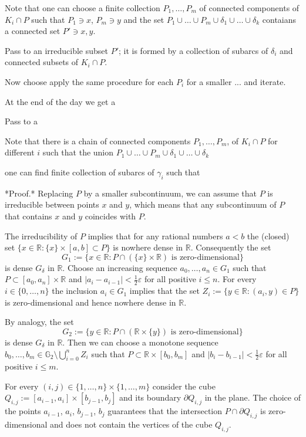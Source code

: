 Note that one can choose a finite collection $P_1,\dots,P_m$ of connected components of $K_i\cap P$ such that $P_1\ni x$, $P_m\ni y$
and the set $P_1\cup\dots\cup P_m\cup\delta_1\cup\dots\cup\delta_k$ contaians a connected set $P'\ni x,y$.

Pass to an irreducible subset $P'$; it is formed by a collection of subarcs of $\delta_i$ and connected subsets of $K_i\cap P$.

Now choose apply the same procedure for each $P_i$ for a smaller ...
and iterate.

At the end of the day we get a 

Pass to a 

Note that there is a chain of connected components $P_1,\dots,P_m$, of $K_i\cap P$ for different $i$ such that the union $P_1\cup\dots\cup P_m\cup\delta_1\cup\dots\cup\delta_k$ 

one can find finite collection of subarcs of $\gamma_i$ such that

*Proof.* Replacing $P$ by a smaller subcontinuum, we can assume that $P$ is irreducible between points $x$ and $y$, which means that any subcontinuum of $P$ that contains $x$ and $y$ coincides with $P$. 

The irreducibility of $P$ implies that for any rational numbers $a<b$ the (closed) set $\{x\in \mathbb R:\{x\}\times[a,b]\subset P\}$ is nowhere dense in $\mathbb R$. Consequently the set $$G_1:=\{x\in\mathbb R:P\cap(\{x\}\times\mathbb R)\mbox{ is zero-dimensional}\}$$is dense $G_\delta$ in $\mathbb R$. Choose an increasing sequence $a_0,\dots,a_n\in G_1$ such that $P\subset [a_0,a_n]\times\mathbb R$ and $|a_i-a_{i-1}|<\frac12\varepsilon$ for all positive $i\le n$. For every $i\in\{0,\dots,n\}$ the inclusion $a_i\in G_1$ implies that the set $Z_i:=\{y\in \mathbb R:(a_i,y)\in P\}$ is zero-dimensional and hence nowhere dense in $\mathbb R$.

By analogy, the set $$G_2:=\{y\in\mathbb R:P\cap(\mathbb R\times \{y\})\mbox{ is zero-dimensional}\}$$is dense $G_\delta$ in $\mathbb R$. Then we can choose a monotone sequence $b_0,\dots,b_m\in\mathbb G_2\setminus\bigcup_{i=0}^nZ_i$ such that $P\subset \mathbb R\times [b_0,b_m]$ and $|b_i-b_{i-1}|<\frac12\varepsilon$ for all positive $i\le m$.

For every $(i,j)\in\{1,\dots,n\}\times\{1,\dots,m\}$ consider the cube $Q_{i,j}:=[a_{i-1},a_i]\times[b_{j-1},b_j]$ and its boundary $\partial Q_{i,j}$ in the plane.
The choice of the points $a_{i-1}$, $a_i$, $b_{j-1}$, $b_j$ guarantees that the intersection $P\cap\partial Q_{i,j}$ is zero-dimensional and does not contain the vertices of the cube $Q_{i,j}$. 

